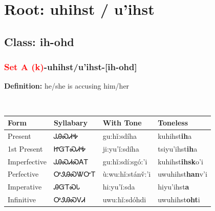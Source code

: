 \needspace{4in}
\section*{Root: uhihst / u'ihst}
\nopagebreak
{}
\needspace{3in}
\subsection*{Class: ih-ohd}
\nopagebreak
\needspace{2in}
\subsubsection*{\textcolor{Red}{Set A (k)}{-}\textbf{uhihst/u'ihst}{-}[ih-ohd]}
\nopagebreak
\textbf{Definition: } he/she is accusing him/her
\\[0.5em]
\begin{tabularx}{\textwidth}{l X X X}%
\toprule%
\textbf{Form}&\textbf{Syllabary}&\textbf{With Tone}&\textbf{Toneless}\\%
\midrule%
Present&ᎫᎯᏍᏗᎭ&gu:hǐ:sdíha&kuhihst\textbf{ih}a\\%
1st Present&ᏥᏳᎢᏍᏗᎭ&ji:yu’ǐ:sdíha&tsiyu'ihst\textbf{ih}a\\%
Imperfective&ᎫᎯᏍᏗᏍᎪᎢ&gu:hǐ:sdí:sgó:’i&kuhihst\textbf{ihsk}o'i\\%
Perfective&ᎤᏭᎯᏍᏔᏅᎢ&ù:wu:hǐ:stánv̌:’i&uwuhihst\textbf{han}v'i\\%
Imperative&ᎯᏳᎢᏍᏓ&hi:yu’ǐ:sda&hiyu'ihst\textbf{a}\\%
Infinitive&ᎤᏭᎯᏍᏙᏗ&uwu:hǐ:sdóhdi&uwuhihst\textbf{oht}i\\%
\bottomrule%
\end{tabularx}
\\[1em]